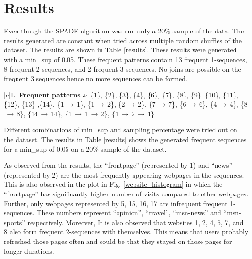 \section{Results}

Even though the SPADE algorithm was run only a 20\% sample of the data. The results generated are constant when tried across multiple random shuffles of the dataset. The results are shown in Table \ref{results}. These results were generated with a min\_sup of 0.05. These frequent patterns contain 13 frequent 1-sequences, 8 frequent 2-sequences, and 2 frequent 3-sequences. No joins are possible on the frequent 3 sequences hence no more sequences can be formed.

\begin{table}[htbp]
    \caption{Frequent patterns generated by SPADE}
    \label{results}
    \begin{center}
        \begin{tabular}{|c|L|}
            \hline
            \textbf{Frequent patterns} & \{1\}, \{2\}, \{3\}, \{4\}, \{6\}, \{7\}, \{8\}, \{9\}, \{10\}, \{11\}, \{12\}, \{13\} ,\{14\}, \{1$\,\to\,$1\}, \{1$\,\to\,$2\}, \{2$\,\to\,$2\}, \{7$\,\to\,$7\}, \{6$\,\to\,$6\}, \{4$\,\to\,$4\}, \{8$\,\to\,$8\}, \{14$\,\to\,$14\}, \{1$\,\to\,$1$\,\to\,$2\}, \{1$\,\to\,$2$\,\to\,$1\} \\
            \hline
        \end{tabular}
    \end{center}
\end{table}

Different combinations of min\_sup and sampling percentage were tried out on the dataset. The results in Table \ref{results} shows the generated frequent sequences for a min\_sup of 0.05 on a 20\% sample of the dataset.

As observed from the results, the ``frontpage'' (represented by 1) and ``news'' (represented by 2) are the most frequently appearing webpages in the sequences. This is also observed in the plot in Fig. \ref{website_histogram} in which the ``frontpage'' has significantly higher number of visits compared to other webpages. Further, only webpages represented by 5, 15, 16, 17 are infrequent frequent 1-sequences. These numbers represent ``opinion'', ``travel'', ``msn-news'' and ``msn-sports'' respectively. Moreover, It is also observed that websites 1, 2, 4, 6, 7, and 8 also form frequent 2-sequences with themselves. This means that users probably refreshed those pages often and could be that they stayed on those pages for longer durations.

